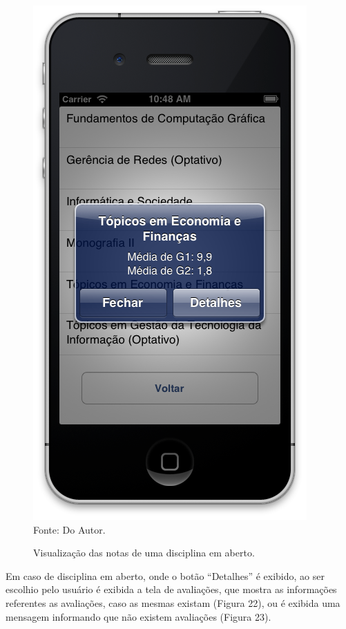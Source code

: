 \begin{figure}[!htb]
     \centering
     \caption[Formulário Notas da Graduação - Visualização de Disciplina Aberta]{Visualização das notas de uma disciplina em aberto.}
     \includegraphics[scale=0.34]{imagens/formvisualizacaomediascomdetalhes.png}
     \\  Fonte: Do Autor.
\end{figure}
\newpage

Em caso de disciplina em aberto, onde o botão ``Detalhes'' é exibido, ao ser escolhio pelo usuário é exibida a tela de avaliações, que mostra as informações referentes as avaliações, caso as mesmas existam (Figura 22), ou é exibida uma mensagem informando que não existem avaliações (Figura 23).


